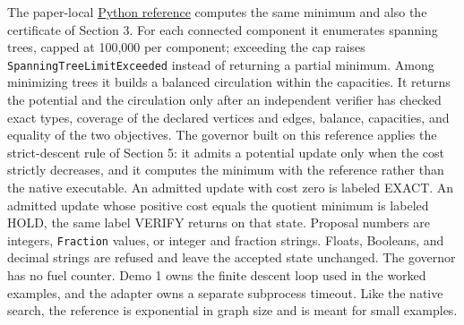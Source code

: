 \documentclass[
  11pt,
]{article}
\newcommand{\passthrough}[1]{#1}
\begin{document}
The paper-local
\href{https://github.com/dbccpage/the_symbol_game/blob/main/education/documentation/030_pfp_proposal_fidelity_protocol_pfp/papers/symbol_game/001_pfp_discrete_cochain_retraction_and_toy_involutions/code/symbol_game_governor.py}{Python
reference} computes the same minimum and also the certificate of Section
3. For each connected component it enumerates spanning trees, capped at
100,000 per component; exceeding the cap raises
\passthrough{\lstinline!SpanningTreeLimitExceeded!} instead of returning
a partial minimum. Among minimizing trees it builds a balanced
circulation within the capacities. It returns the potential and the
circulation only after an independent verifier has checked exact types,
coverage of the declared vertices and edges, balance, capacities, and
equality of the two objectives. The governor built on this reference
applies the strict-descent rule of Section 5: it admits a potential
update only when the cost strictly decreases, and it computes the
minimum with the reference rather than the native executable. An
admitted update with cost zero is labeled EXACT. An admitted update
whose positive cost equals the quotient minimum is labeled HOLD, the
same label VERIFY returns on that state. Proposal numbers are integers,
\passthrough{\lstinline!Fraction!} values, or integer and fraction
strings. Floats, Booleans, and decimal strings are refused and leave the
accepted state unchanged. The governor has no fuel counter. Demo 1 owns
the finite descent loop used in the worked examples, and the adapter
owns a separate subprocess timeout. Like the native search, the
reference is exponential in graph size and is meant for small examples.
\end{document}
